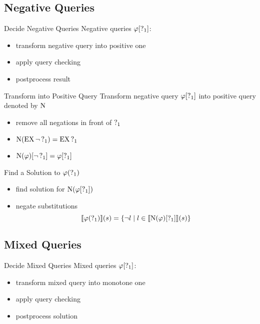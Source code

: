 \subsection{Negative Queries}%

\begin{frame}{Decide Negative Queries}
  Negative queries $\varphi[\operatorname{?}_1]$:
  \begin{itemize}
    \item transform negative query into positive one
    \item apply query checking
    \item postprocess result
  \end{itemize}
\end{frame}

\begin{frame}{Transform into Positive Query}
  Transform negative query $\varphi[\operatorname{?}_1]$ into positive query denoted by $\operatorname{N}$
  \begin{itemize}
    \item remove all negations in front of $\operatorname{?}_{1}$
    \item $\operatorname{N}(\operatorname{EX} \lnot \operatorname{?}_1) = \operatorname{EX} \operatorname{?}_{1}$
    \item $\operatorname{N}(\varphi)[\lnot\operatorname{?}_1] = \varphi[\operatorname{?}_1]$
  \end{itemize}
\end{frame}

\begin{frame}{Find a Solution to $\varphi(\operatorname{?}_1)$}
  \begin{itemize}
    \item find solution for $\operatorname{N}(\varphi[\operatorname{?}_1])$
    \item negate substitutions \\
      \[
        \llbracket \varphi(\operatorname{?}_1) \rrbracket (s) = \{ \lnot l \mid l \in 
          \llbracket \operatorname{N}(\varphi)[\operatorname{?}_1] \rrbracket (s) \}
      \]
  \end{itemize}
\end{frame}



\subsection{Mixed Queries}%

\begin{frame}{Decide Mixed Queries}
  Mixed queries $\varphi[\operatorname{?}_1]$:
  \begin{itemize}
    \item transform mixed query into monotone one
    \item apply query checking
    \item postprocess solution
  \end{itemize}
\end{frame}

